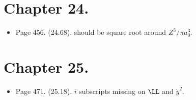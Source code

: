 \section{Chapter 24.}
\begin{itemize}
\item Page 456.  (24.68).  should be square root around $Z^3/\pi a_0^3$.
\end{itemize}

\section{Chapter 25.}
\begin{itemize}
\item Page 471.  (25.18).  $i$ subscripts missing on $\LL$ and $\dot{y}^2$.
\end{itemize}
